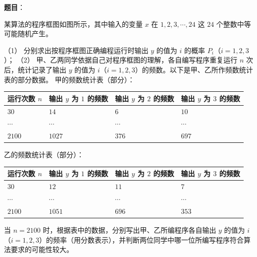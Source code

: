 \begin{answer}

\textbf{题目}：

某算法的程序框图如图所示，其中输入的变量 $x$ 在 $1,2,3,\cdots,24$ 这 $24$ 个整数中等可能随机产生。
\nopagebreak[4]
\begin{center}\end{center}
\nopagebreak[4]
（1） 分别求出按程序框图正确编程运行时输出 $y$ 的值为 $i$ 的概率 $P_i$（$i=1,2,3$）；
（2） 甲、乙两同学依据自己对程序框图的理解，各自编写程序重复运行 $n$ 次后，统计记录了输出 $y$ 的值为 $i$（$i=1,2,3$）的频数。以下是甲、乙所作频数统计表的部分数据。
甲的频数统计表（部分）：
\begin{center}
\begin{tabular}{llll}
\toprule
运行次数 $n$ & 输出 $y$ 为 $1$ 的频数 & 输出 $y$ 为 $2$ 的频数 & 输出 $y$ 为 $3$ 的频数 \\
\midrule
$30$ & $14$ & $6$ & $10$ \\
$\cdots$ & $\cdots$ & $\cdots$ & $\cdots$ \\
$2100$ & $1027$ & $376$ & $697$ \\
\bottomrule
\end{tabular}
\end{center}
乙的频数统计表（部分）：
\begin{center}
\begin{tabular}{llll}
\toprule
运行次数 $n$ & 输出 $y$ 为 $1$ 的频数 & 输出 $y$ 为 $2$ 的频数 & 输出 $y$ 为 $3$ 的频数 \\
\midrule
$30$ & $12$ & $11$ & $7$ \\
$\cdots$ & $\cdots$ & $\cdots$ & $\cdots$ \\
$2100$ & $1051$ & $696$ & $353$ \\
\bottomrule
\end{tabular}
\end{center}
当 $n=2100$ 时，根据表中的数据，分别写出甲、乙所编程序各自输出 $y$ 的值为 $i$（$i=1,2,3$）的频率（用分数表示），并判断两位同学中哪一位所编写程序符合算法要求的可能性较大。


\end{answer}
